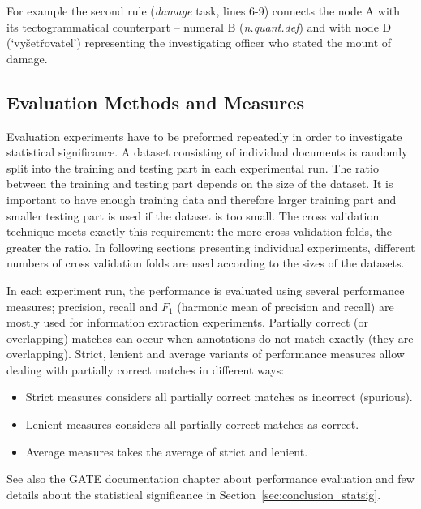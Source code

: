 For example the second rule (\emph{damage} task, lines 6-9) connects the node A with its tectogrammatical counterpart -- numeral B (\emph{n.quant.def}) and with node D (`vyšetřovatel') representing the investigating officer who stated the mount of damage. 



\subsection{Evaluation Methods and Measures}

Evaluation experiments have to be preformed repeatedly in order to investigate statistical significance. A dataset consisting of individual documents is randomly split into the training and testing part in each experimental run. The ratio between the training and testing part depends on the size of the dataset. It is important to have enough training data and therefore larger training part and smaller testing part is used if the dataset is too small. The cross validation technique meets exactly this requirement: the more cross validation folds, the greater the ratio. In following sections presenting individual experiments, different numbers of cross validation folds are used according to the sizes of the datasets.

In each experiment run, the performance is evaluated using several performance measures; precision, recall and $F_1$ (harmonic mean of precision and recall) are mostly used for information extraction experiments. Partially correct (or overlapping) matches can occur when annotations do not match exactly (they are overlapping). Strict, lenient and average variants of performance measures allow dealing with partially correct matches in different ways:
\begin{itemize}
	\item     Strict measures considers all partially correct matches as incorrect (spurious).
	\item     Lenient measures considers all partially correct matches as correct.
	\item     Average measures takes the average of strict and lenient.
\end{itemize}

See also the GATE documentation chapter about performance evaluation
and few details about the statistical significance in Section~\ref{sec:conclusion_statsig}.



